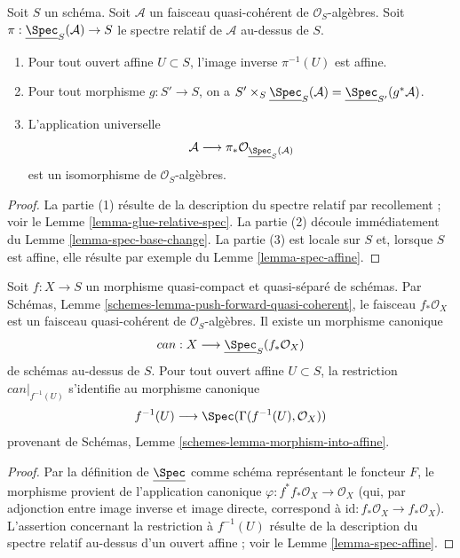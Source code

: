 \begin{lemma}
\label{lemma-spec-properties}
Soit $S$ un schéma. Soit $\mathcal{A}$ un faisceau quasi-cohérent
de $\mathcal{O}_S$-algèbres. Soit
$\pi : \underline{\Spec}_S(\mathcal{A}) \to S$
le spectre relatif de $\mathcal{A}$ au-dessus de $S$.
\begin{enumerate}
\item Pour tout ouvert affine $U \subset S$, l'image inverse
$\pi^{-1}(U)$ est affine.
\item Pour tout morphisme $g : S' \to S$, on a
$S' \times_S \underline{\Spec}_S(\mathcal{A}) =
\underline{\Spec}_{S'}(g^*\mathcal{A})$.
\item
L'application universelle
$$
\mathcal{A}
\longrightarrow
\pi_*\mathcal{O}_{\underline{\Spec}_S(\mathcal{A})}
$$
est un isomorphisme de $\mathcal{O}_S$-algèbres.
\end{enumerate}
\end{lemma}

\begin{proof}
La partie (1) résulte de la description du spectre relatif par recollement ;
voir le Lemme \ref{lemma-glue-relative-spec}.
La partie (2) découle immédiatement du Lemme \ref{lemma-spec-base-change}.
La partie (3) est locale sur $S$ et, lorsque $S$ est affine, elle résulte
par exemple du Lemme \ref{lemma-spec-affine}.
\end{proof}

\begin{lemma}
\label{lemma-canonical-morphism}
Soit $f : X \to S$ un morphisme quasi-compact et quasi-séparé de schémas.
Par Schémas, Lemme \ref{schemes-lemma-push-forward-quasi-coherent},
le faisceau $f_*\mathcal{O}_X$ est un faisceau quasi-cohérent de
$\mathcal{O}_S$-algèbres. Il existe un morphisme canonique
$$
can : X \longrightarrow \underline{\Spec}_S(f_*\mathcal{O}_X)
$$
de schémas au-dessus de $S$.
Pour tout ouvert affine $U \subset S$, la restriction $can|_{f^{-1}(U)}$
s'identifie au morphisme canonique
$$
f^{-1}(U) \longrightarrow \Spec(\Gamma(f^{-1}(U), \mathcal{O}_X))
$$
provenant de Schémas, Lemme \ref{schemes-lemma-morphism-into-affine}.
\end{lemma}

\begin{proof}
Par la définition de $\underline{\Spec}$ comme schéma représentant le
foncteur $F$, le morphisme provient de l'application canonique
$\varphi : f^*f_*\mathcal{O}_X \to \mathcal{O}_X$ (qui, par adjonction entre
image inverse et image directe, correspond à
$\text{id} : f_*\mathcal{O}_X \to f_*\mathcal{O}_X$).
L'assertion concernant la restriction à $f^{-1}(U)$
résulte de la description du spectre relatif au-dessus d'un ouvert affine ;
voir le Lemme \ref{lemma-spec-affine}.
\end{proof}











